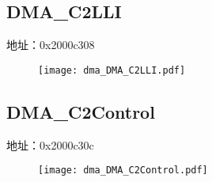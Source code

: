 \subsection{DMA\_C2LLI}
\label{dma-DMA-C2LLI}
地址：0x2000c308
 \begin{figure}[H]
\texttt{[image: dma\_DMA\_C2LLI.pdf]}
\end{figure}

\subsection{DMA\_C2Control}
\label{dma-DMA-C2Control}
地址：0x2000c30c
 \begin{figure}[H]
\texttt{[image: dma\_DMA\_C2Control.pdf]}
\end{figure}

